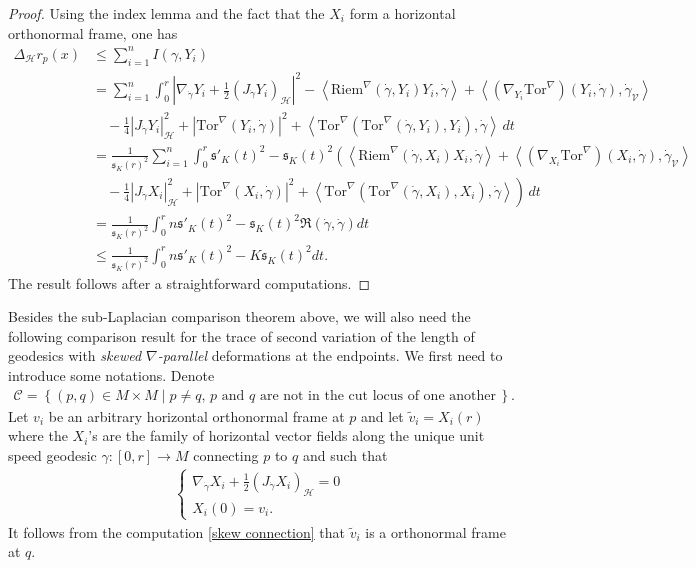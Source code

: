 \documentclass[11pt]{article}
\numberwithin{equation}{section}
\newcommand{\Ho}{\mathcal H}
\newcommand{\V}{\mathcal V}
\newcommand{\Tor}{\mathrm{Tor}}
\begin{document}
\begin{proof}
Using the index lemma and the fact that the $X_i$ form a horizontal orthonormal frame, one has
\begin{align*}
\Delta_\Ho r_p (x) & \le \sum_{i=1}^n I(\gamma,Y_i) \\
  &=  \sum_{i=1}^n  \int_0^r  \left | \nabla_{\dot \gamma}  Y_i +\frac{1}{2} (J_{\dot \gamma}  Y_i)_\mathcal{H}   \right|^2  -\left \langle \mathrm{Riem}^\nabla(\dot \gamma,Y_i)Y_i, \dot \gamma \right \rangle  +\left\langle (\nabla_{Y_i} \Tor^\nabla)(Y_i,\dot\gamma),\dot \gamma_\V \right\rangle\\
 &\quad -\frac{1}{4} | J_{\dot \gamma} Y_i |^2_\Ho+ |\Tor^\nabla(Y_i,\dot\gamma)|^2+\left\langle \Tor^\nabla(\Tor^\nabla(\dot\gamma,Y_i),Y_i),\dot \gamma \right\rangle \, dt \\
 &=\frac{1}{\mathfrak{s}_K(r)^2}\sum_{i=1}^n  \int_0^r  \mathfrak{s}'_K(t)^2  - \mathfrak{s}_K(t)^2 \left(  \left \langle \mathrm{Riem}^\nabla(\dot \gamma,X_i)X_i, \dot \gamma \right \rangle  +\left\langle (\nabla_{X_i} \Tor^\nabla)(X_i,\dot\gamma),\dot \gamma_\V \right\rangle \right. \\
 &\left. \quad -\frac{1}{4} | J_{\dot \gamma} X_i |^2_\Ho+ |\Tor^\nabla(X_i,\dot\gamma)|^2+\left\langle \Tor^\nabla(\Tor^\nabla(\dot\gamma,X_i),X_i),\dot \gamma \right\rangle \right) \, dt \\
 &=\frac{1}{\mathfrak{s}_K(r)^2}  \int_0^r n  \mathfrak{s}'_K(t)^2-\mathfrak{s}_K(t)^2 \mathfrak{R}(\dot \gamma,\dot \gamma)  dt \\
 &\le \frac{1}{\mathfrak{s}_K(r)^2}  \int_0^r n  \mathfrak{s}'_K(t)^2- K \mathfrak{s}_K(t)^2  dt.
\end{align*}
The result follows after a straightforward computations.
\end{proof}

Besides the sub-Laplacian comparison theorem above, we will also need the following comparison result for the trace of second variation of the length of geodesics with  \textit{skewed $\nabla$-parallel} deformations at the endpoints. We first need to introduce some notations. Denote
\begin{align}\label{bi cut-locus}
\mathcal{C} =\left\{ (p,q) \in M \times M \mid p\neq q, \, p \text{  and  } q \text{ are not in the cut locus of one another} \, \right\}.
\end{align}
Let $v_i$ be  an arbitrary horizontal orthonormal frame at $p$ and let  $\tilde{v}_i=X_i(r)$ where the $X_i$'s are the family of horizontal vector fields  along the unique unit speed geodesic $\gamma:[0,r] \to M$ connecting $p$ to $q$ and such that
\begin{align*}
\begin{cases}
\nabla_{\dot \gamma}X_i+\frac{1}{2} (J_{\dot \gamma} X_i)_\mathcal{H}=0 \\
X_i(0)=v_i.
\end{cases}
\end{align*}
It follows from the computation \eqref{skew connection} that $\tilde{v}_i$ is a orthonormal frame at $q$.
\end{document}
